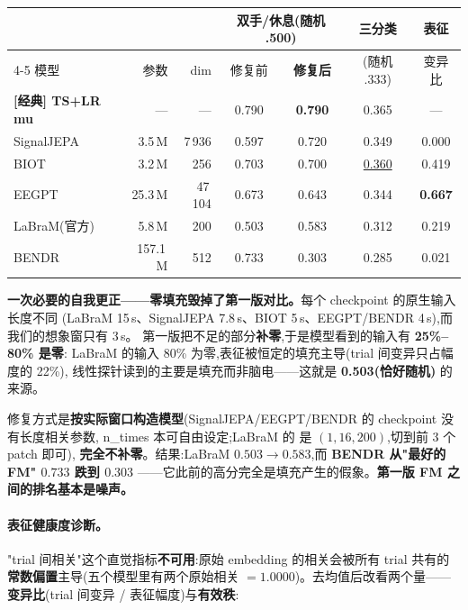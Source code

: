 \documentclass[11pt]{ctexart}
\begin{document}
\begin{center}\small
\begin{tabular}{@{}lrrcccc@{}}
\toprule
& & & \multicolumn{2}{c}{双手/休息(随机 .500)} & 三分类 & 表征 \\
\cmidrule(lr){4-5}
模型 & 参数 & dim & 修复前 & \textbf{修复后} & (随机 .333) & 变异比 \\
\midrule
\textbf{[经典] TS+LR mu} & — & — & 0.790 & \textbf{0.790} & 0.365 & — \\
\midrule
SignalJEPA   & 3.5\,M   & 7\,936  & 0.597 & 0.720 & 0.349 & \textcolor{bad}{0.000} \\
BIOT         & 3.2\,M   & 256     & 0.703 & 0.700 & \underline{0.360} & 0.419 \\
EEGPT        & 25.3\,M  & 47\,104 & 0.673 & 0.643 & 0.344 & \textbf{0.667} \\
LaBraM(官方) & 5.8\,M   & 200     & \textcolor{bad}{0.503} & 0.583 & 0.312 & 0.219 \\
BENDR        & 157.1\,M & 512     & \textcolor{bad}{0.733} & \textcolor{bad}{0.303} & 0.285 & \textcolor{bad}{0.021} \\
\bottomrule
\end{tabular}
\end{center}

\begin{mdframed}[linecolor=bad,backgroundcolor=bad!5]
\textbf{一次必要的自我更正——零填充毁掉了第一版对比。}每个 checkpoint 的原生输入长度不同
(LaBraM 15\,s、SignalJEPA 7.8\,s、BIOT 5\,s、EEGPT/BENDR 4\,s),而我们的想象窗只有 3\,s。
第一版把不足的部分\textbf{补零},于是模型看到的输入有 \textbf{25\%--80\% 是零}:
LaBraM 的输入 80\% 为零,表征被恒定的填充主导(trial 间变异只占幅度的 22\%),
线性探针读到的主要是填充而非脑电——这就是 \textbf{0.503(恰好随机)} 的来源。

修复方式是\textbf{按实际窗口构造模型}(SignalJEPA/EEGPT/BENDR 的 checkpoint 没有长度相关参数,
n\_times 本可自由设定;LaBraM 的  是 $(1,16,200)$,切到前 3 个 patch 即可),
\textbf{完全不补零}。结果:LaBraM $0.503\to0.583$,而 \textbf{BENDR 从"最好的 FM" $0.733$ 跌到 $0.303$}
——它此前的高分完全是填充产生的假象。\textbf{第一版 FM 之间的排名基本是噪声。}
\end{mdframed}

\paragraph{表征健康度诊断。}"trial 间相关"这个直觉指标\textbf{不可用}:原始 embedding 的相关会被所有
trial 共有的\textbf{常数偏置}主导(五个模型里有两个原始相关 $=1.0000$)。去均值后改看两个量——
\textbf{变异比}(trial 间变异 / 表征幅度)与\textbf{有效秩}:
\end{document}
